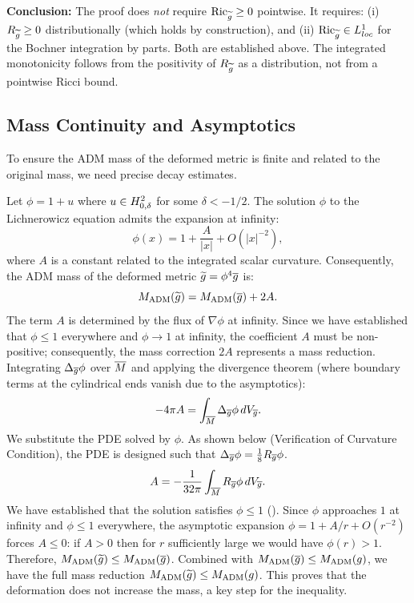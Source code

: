 \begin{remark}
\textbf{Conclusion:} The proof does \emph{not} require $\mathrm{Ric}_{\widetilde{g}} \ge 0$ pointwise. It requires: (i) $R_{\widetilde{g}} \ge 0$ distributionally (which holds by construction), and (ii) $\mathrm{Ric}_{\widetilde{g}} \in L^1_{loc}$ for the Bochner integration by parts. Both are established above. The integrated monotonicity follows from the positivity of $R_{\widetilde{g}}$ as a distribution, not from a pointwise Ricci bound.
\end{remark}

\subsection{Mass Continuity and Asymptotics}
\label{sec:MassContinuity}

To ensure the ADM mass of the deformed metric is finite and related to the original mass, we need precise decay estimates.

\begin{theorem}\label{thm:MassReduction}
Let $\phi = 1 + u$ where $u \in H^{2}_{0,\delta}$ for some $\delta < -1/2$. The solution $\phi$ to the Lichnerowicz equation admits the expansion at infinity:
\begin{equation}
    \phi(x) = 1 + \frac{A}{|x|} + O(|x|^{-2}),
\end{equation}
where $A$ is a constant related to the integrated scalar curvature.
Consequently, the ADM mass of the deformed metric $\widetilde{g} = \phi^4 \overline{g}$ is:
\begin{equation}
    M_{\mathrm{ADM}}(\widetilde{g}) = M_{\mathrm{ADM}}(\overline{g}) + 2A.
\end{equation}
The term $A$ is determined by the flux of $\nabla\phi$ at infinity. Since we have established that $\phi \le 1$ everywhere and $\phi \to 1$ at infinity, the coefficient $A$ must be non-positive; consequently, the mass correction $2A$ represents a mass reduction. Integrating $\Delta_{\overline{g}}\phi$ over $\overline{M}$ and applying the divergence theorem (where boundary terms at the cylindrical ends vanish due to the asymptotics):
\[ -4\pi A = \int_{\overline{M}} \Delta_{\overline{g}}\phi \, dV_{\overline{g}}. \]
We substitute the PDE solved by $\phi$. As shown below (Verification of Curvature Condition), the PDE is designed such that $\Delta_{\overline{g}}\phi = \frac{1}{8}R_{\overline{g}} \phi$.
\[ A = -\frac{1}{32\pi} \int_{\overline{M}} R_{\overline{g}} \phi \, dV_{\overline{g}}. \]
We have established that the solution satisfies $\phi \le 1$ (). Since $\phi$ approaches $1$ at infinity and $\phi\le 1$ everywhere, the asymptotic expansion $\phi = 1 + A/r + O(r^{-2})$ forces $A \le 0$: if $A>0$ then for $r$ sufficiently large we would have $\phi(r) > 1$.
Therefore, $M_{\mathrm{ADM}}(\widetilde{g}) \le M_{\mathrm{ADM}}(\overline{g})$. Combined with $M_{\mathrm{ADM}}(\overline{g}) \le M_{\mathrm{ADM}}(g)$, we have the full mass reduction $M_{\mathrm{ADM}}(\widetilde{g}) \le M_{\mathrm{ADM}}(g)$.
This proves that the deformation does not increase the mass, a key step for the inequality.
\end{theorem}

